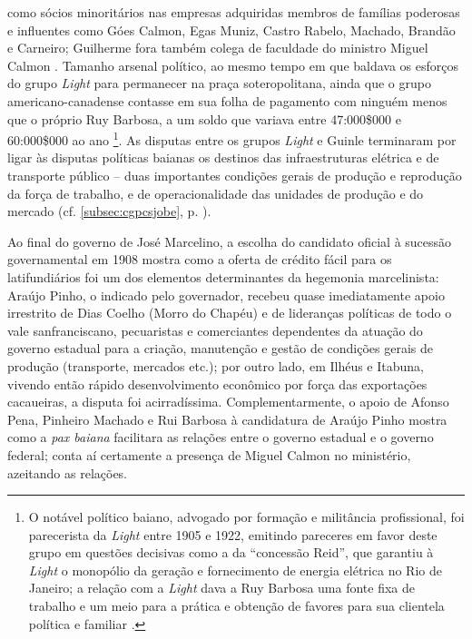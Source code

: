 como sócios minoritários nas empresas adquiridas membros de famílias poderosas e influentes como Góes Calmon, Egas Muniz, Castro Rabelo, Machado, Brandão e Carneiro; Guilherme fora também colega de faculdade do ministro Miguel Calmon \cite[p.~50]{CUNHA2011}. Tamanho arsenal político, ao mesmo tempo em que baldava os esforços do grupo \textit{Light} para permanecer na praça soteropolitana, ainda que o grupo americano-canadense contasse em sua folha de pagamento com ninguém menos que o próprio Ruy Barbosa, a um soldo que variava entre 47:000\$000 e 60:000\$000 ao ano \cite[pp.~56-58]{CUNHA2011}\footnote{O notável político baiano, advogado por formação e militância profissional, foi parecerista da \textit{Light} entre 1905 e 1922, emitindo pareceres em favor deste grupo em questões decisivas como a da ``concessão Reid'', que garantiu à \textit{Light} o monopólio da geração e fornecimento de energia elétrica no Rio de Janeiro; a relação com a \textit{Light} dava a Ruy Barbosa uma fonte fixa de trabalho e um meio para a prática e obtenção de favores para sua clientela política e familiar \cite[pp.~56-57]{CUNHA2011}.}. As disputas entre os grupos \textit{Light} e Guinle terminaram por ligar às disputas políticas baianas os destinos das infraestruturas elétrica e de transporte público -- duas importantes condições gerais de produção e reprodução da força de trabalho, e de operacionalidade das unidades de produção e do mercado (cf. \autoref{subsec:cgpcsjobe}, p. \pageref{subsec:cgpcsjobe}).

Ao final do governo de José Marcelino, a escolha do candidato oficial à sucessão governamental em 1908 mostra como a oferta de crédito fácil para os latifundiários foi um dos elementos determinantes da hegemonia marcelinista: Araújo Pinho, o indicado pelo governador, recebeu quase imediatamente apoio irrestrito de Dias Coelho (Morro do Chapéu) e de lideranças políticas de todo o vale sanfranciscano, pecuaristas e comerciantes dependentes da atuação do governo estadual para a criação, manutenção e gestão de condições gerais de produção (transporte, mercados etc.); por outro lado, em Ilhéus e Itabuna, vivendo então rápido desenvolvimento econômico por força das exportações cacaueiras, a disputa foi acirradíssima. Complementarmente, o apoio de Afonso Pena, Pinheiro Machado e Rui Barbosa à candidatura de Araújo Pinho mostra como a \textit{pax baiana} facilitara as relações entre o governo estadual e o governo federal; conta aí certamente a presença de Miguel Calmon no ministério, azeitando as relações. 


